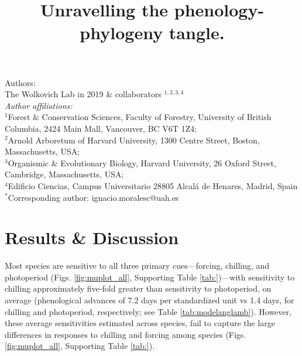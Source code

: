 \documentclass{article}\usepackage[]{graphicx}\usepackage[]{color}
\title{Unravelling the phenology-phylogeny tangle.}
\begin{document}
\maketitle

\noindent Authors:\\
The Wolkovich Lab in 2019 \& collaborators $^{1,2,3,4}$ %
\vspace{2ex}\\
\emph{Author affiliations:}\\
$^{1}$Forest \& Conservation Sciences, Faculty of Forestry, University of British Columbia, 2424 Main Mall, Vancouver, BC V6T 1Z4;\\
$^{2}$Arnold Arboretum of Harvard University, 1300 Centre Street, Boston, Massachusetts, USA;\\
$^{3}$Organismic \& Evolutionary Biology, Harvard University, 26 Oxford Street, Cambridge, Massachusetts, USA;\\
$^{4}$Edificio Ciencias, Campus Universitario 28805 Alcalá de Henares, Madrid, Spain\\
 

\vspace{2ex}
$^*$Corresponding author: ignacio.moralesc@uah.es\\
\renewcommand{\thetable}{\arabic{table}}
\renewcommand{\thefigure}{\arabic{figure}}
\renewcommand{\labelitemi}{$-$}

\clearpage







\section*{Results \& Discussion}

Most species are sensitive to all three primary cues---forcing, chilling, and photoperiod (Figs. \ref{fig:muplot_all}, Supporting Table \ref{tab:})\citep[see also][]{Laube:2014a,ettinger2020}---with sensitivity to chilling approximately five-fold greater than sensitivity to photoperiod, on average (phenological advances of 7.2 days per standardized unit vs 1.4 days, for chilling and photoperiod, respectively; see Table \ref{tab:modelanglamb}). However, these average sensitivities estimated across species, fail to capture the large differences in responses to chilling and forcing among species (Figs. \ref{fig:muplot_all}, Supporting Table \ref{tab:}). 
\end{document}
